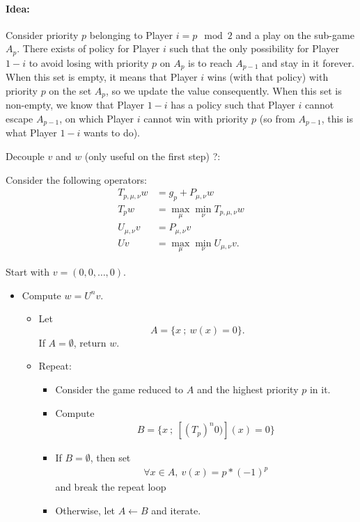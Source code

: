 \documentclass{article}
\begin{document}
\paragraph{Idea:} Consider priority $p$ belonging to Player $i=p \mod 2$ and a play on the sub-game $A_p$. There exists of policy for Player $i$ such that the only possibility for Player $1-i$ to avoid losing with priority $p$ on $A_p$ is to reach $A_{p-1}$ and stay in it forever. When this set is empty, it means that Player $i$ wins (with that policy) with priority $p$ on the set $A_p$, so we update the value consequently. When this set is non-empty, we know that Player $1-i$ has a policy such that Player $i$ cannot escape $A_{p-1}$, on which Player $i$ cannot win with priority $p$ (so from $A_{p-1}$, this is what Player $1-i$ wants to do).

\newpage
Decouple $v$ and $w$ (only useful on the first step) ?:

Consider the following operators:
\begin{align}
  T_{p,\mu,\nu}w & = g_p + P_{\mu,\nu} w\\
  T_{p}w & = \max_\mu \min_\nu T_{p,\mu,\nu}w\\
  U_{\mu,\nu} v & = P_{\mu,\nu}v \\
  U v & = \max_\mu \min_\nu U_{\mu,\nu}v.
\end{align}


Start with $v=(0,0,\dots,0)$.
\begin{itemize}
\item Compute $w=U^n v$.
  \begin{itemize}
  \item Let $$A=\{ x ~;~ w(x)=0 \}.$$ If $A=\emptyset$, return $w$.
    \item Repeat:
      \begin{itemize}
      \item Consider the game reduced to $A$ and the highest priority $p$ in it.
      \item Compute
        \begin{align}
          B = \{x ~;~ [(T_p)^n 0)](x)=0 \}
        \end{align}
      \item If $B=\emptyset$, then set
        \begin{align}
          \forall x \in A,~ v(x)=p*(-1)^p
        \end{align}
        and break the repeat loop
      \item Otherwise, let $A \leftarrow B$ and iterate.
      \end{itemize}
  \end{itemize}
\end{itemize}


 
\end{document}
